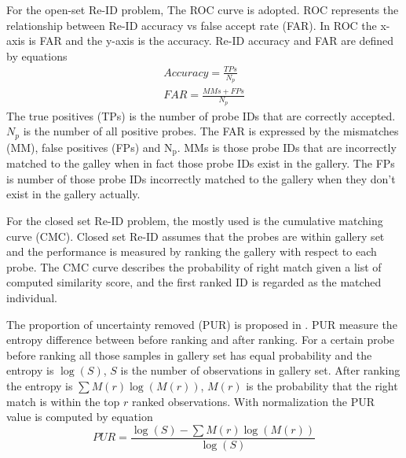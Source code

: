 For the open-set Re-ID problem, The ROC \cite{PartbasedSTReid, MultiPersonREID} curve is adopted. ROC represents the relationship between Re-ID accuracy vs false accept rate (FAR). In ROC the x-axis is FAR and the y-axis is the accuracy. Re-ID accuracy and FAR are defined by equations
\begin{equation}
\begin{aligned}
Accuracy = \frac{TPs}{N_p}\\
FAR = \frac{MMs + FPs}{N_p}
\end{aligned}
\end{equation}
The true positives (TPs) is the number of probe IDs that are correctly accepted. $N_p$ is the number of all positive probes. The FAR is expressed by the mismatches (MM), false positives (FPs) and N$_\text{p}$. MMs is those probe IDs that are incorrectly matched to the galley when in fact those probe IDs exist in the gallery. The FPs is number of those probe IDs incorrectly matched to the gallery when they don't exist in the gallery actually. 

For the closed set Re-ID problem, the mostly used is the cumulative matching curve (CMC). Closed set Re-ID assumes that the probes are within gallery set and the performance is measured by ranking the gallery with respect to each probe. The CMC curve describes the probability of right match given a list of computed similarity score, and the first ranked ID is regarded as the matched individual.

The proportion of uncertainty removed (PUR) is proposed in \cite{LFDA}. PUR measure the entropy difference between before ranking and after ranking. For a certain probe before ranking all those samples in gallery set has equal probability and the entropy is $\log(S)$, $S$ is the number of observations in gallery set. After ranking the entropy is $\sum M(r)\log(M(r))$, $M(r)$ is the probability that the right match is within the top $r$ ranked observations. With normalization the PUR value is computed by equation
\begin{equation}
PUR = \frac{\log(S)-\sum M(r)\log(M(r))}{\log(S)}
\end{equation}

